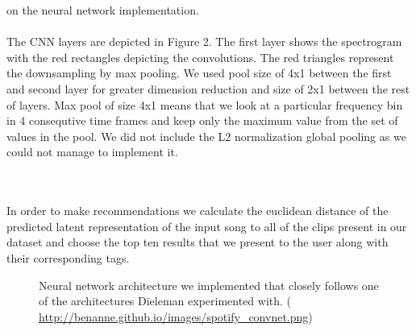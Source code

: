 \documentclass[11pt, a4paper]{article}
\begin{document}
    on the neural network implementation.
    \\ \\
    \noindent
    The CNN layers are depicted in Figure 2. The first layer shows the
    spectrogram with the red rectangles depicting the convolutions. The red
    triangles represent the downsampling by max pooling. We used pool size
    of 4x1 between the first and second layer for greater dimension reduction
    and size of 2x1 between the rest of layers. Max pool of size 4x1 means that
    we look at a particular frequency bin in 4 consequtive time frames and keep
    only the maximum value from the set of values in the pool. We did not
    include the L2 normalization global pooling as we could not manage to
    implement it.

    \\ \\
    \noindent
    In order to make recommendations we calculate the euclidean distance of the
    predicted latent representation of the input song to all of the clips
    present in our dataset and choose the top ten results that we present to
    the user along with their corresponding tags.

    \begin{figure}
      \centering
      \caption{Neural network architecture we implemented that closely follows
        one of the architectures Dieleman experimented with.
        (\url{ http://benanne.github.io/images/spotify\_convnet.png})}
    \end{figure}
\end{document}
